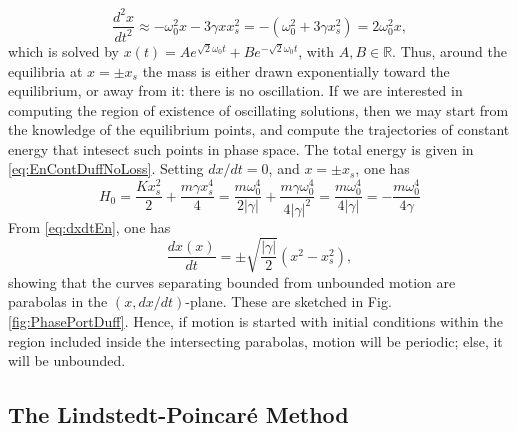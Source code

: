 \documentclass[11pt,twoside,a4paper,english]{book}
\begin{document}
\begin{equation}
    \frac{d^2 x}{dt^2} \approx -\omega_0^2 x -3\gamma x x_s^2 = -\left(\omega_0^2 + 3 \gamma x_s^2\right) = 2\omega_0^2 x, 
\end{equation}
which is solved by $x(t) = A e^{\sqrt{2}\omega_0 t} + B e^{-\sqrt{2}\omega_0 t}$, with $A,B \in \mathbb{R}$. Thus, around the equilibria at $x=\pm x_s$ the mass is either drawn exponentially toward the equilibrium, or away from it: there is no oscillation. If we are interested in computing the region of existence of oscillating solutions, then we may start from the knowledge of the equilibrium points, and compute the trajectories of constant energy that intesect such points in phase space. The total energy is given in \eqref{eq:EnContDuffNoLoss}. Setting $dx/dt=0$, and $x = \pm x_s$, one has
\begin{equation}
    H_0 = \frac{K x_s^2}{2} + \frac{m\gamma x_s^4}{4} = \frac{m \omega_0^4}{2|\gamma|} + \frac{m \gamma \omega_0^4}{4|\gamma|^2} = \frac{m \omega_0^4}{4|\gamma|} = - \frac{m \omega_0^4}{4\gamma}
\end{equation}
From \eqref{eq:dxdtEn}, one has
\begin{equation}
    \frac{dx(x)}{dt} = \pm \sqrt{\frac{|\gamma|}{2}}\left(x^2-x_s^2 \right),
\end{equation}
showing that the curves separating bounded from unbounded motion are parabolas in the $(x,dx/dt)$-plane. These are sketched in Fig. \ref{fig:PhasePortDuff}. Hence, if motion is started with initial conditions within the region included inside the intersecting parabolas, motion will be periodic; else, it will be unbounded.



\subsection{The Lindstedt-Poincar{\'e} Method}
\end{document}
